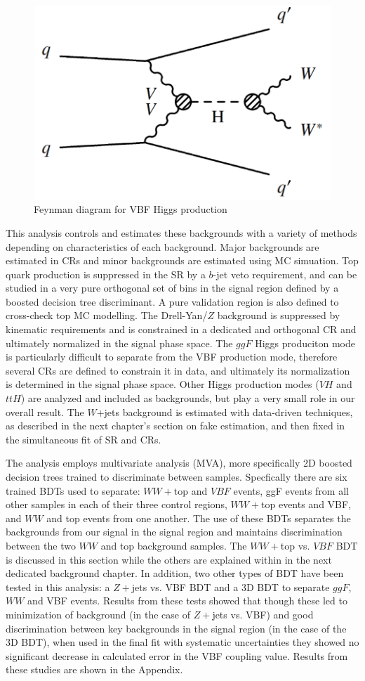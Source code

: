 \begin{figure}[!htbp]
    \centering
    \includegraphics[width=0.2\linewidth]{Pictures/fig_01b_2.pdf}
    \caption{Feynman diagram for VBF Higgs production \cite{Djouadi}}
    \label{fig:FeynmanDiagramVBF}
\end{figure}

This analysis controls and estimates these backgrounds with a variety of methods depending on characteristics of each background. Major backgrounds are estimated in CRs and minor backgrounds are estimated using MC simuation. Top quark production is suppressed in the SR by a $b$-jet veto requirement, and can be studied in a very pure orthogonal set of bins in the signal region defined by a boosted decision tree discriminant. A pure validation region is also defined to cross-check top MC modelling. The Drell-Yan/$Z$ background is suppressed by kinematic requirements and is constrained in a dedicated and orthogonal CR and ultimately normalized in the signal phase space. The $ggF$ Higgs produciton mode is particularly difficult to separate from the VBF production mode, therefore several CRs are defined to constrain it in data, and ultimately its normalization is determined in the signal phase space. Other Higgs production modes ($VH$ and $ttH$) are analyzed and included as backgrounds, but play a very small role in our overall result. The $W$+jets background is estimated with data-driven techniques, as described in the next chapter's section on fake estimation, and then fixed in the simultaneous fit of SR and CRs.

The analysis employs multivariate analysis (MVA), more specifically 2D boosted decision trees trained to discriminate between samples. Specfically there are six trained BDTs used to separate: $WW+$top and $VBF$ events, ggF events from all other samples in each of their three control regions, $WW+$top events and VBF, and $WW$ and top events from one another. The use of these BDTs separates the backgrounds from our signal in the signal region and maintains discrimination between the two $WW$ and top background samples. The  $WW+$top vs. $VBF$ BDT is discussed in this section while the others are explained within in the next dedicated background chapter. In addition, two other types of BDT have been tested in this analysis: a $Z+$jets vs. VBF BDT and a 3D BDT to separate $ggF$, $WW$ and VBF events. Results from these tests showed that though these led to minimization of background (in the case of $Z+$jets vs. VBF) and good discrimination between key backgrounds in the signal region (in the case of the 3D BDT), when used in the final fit with systematic uncertainties they showed no significant decrease in calculated error in the VBF coupling value. Results from these studies are shown in the Appendix. 

